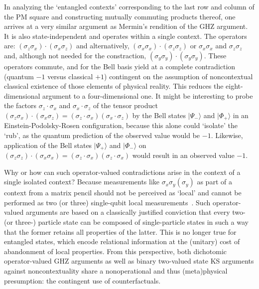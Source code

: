 \documentclass[
  twocolumn,
 showpacs,
 showkeys,
 preprintnumbers,
 amsmath,amssymb,
 aps,
 prl,
  longbibliography,
 floatfix,
 ]{revtex4-2}
\newcommand\myotimes{ }
\begin{document}
In analyzing the `entangled contexts' corresponding to the last row and column of the PM square and
constructing mutually commuting products thereof, one arrives at a very similar argument as Mermin's rendition of the GHZ argument.
It is also state-independent and operates within a single context. The operators are:
$
(\sigma_z \myotimes \sigma_x) \cdot (\sigma_x \myotimes \sigma_z)
$  and alternatively,
$
(\sigma_x\myotimes \sigma_x) \cdot (\sigma_z\myotimes \sigma_z)
$
or
$
\sigma_x\myotimes \sigma_x
$
and
$\sigma_z\myotimes \sigma_z
$
and, although not needed for the constraction,
$(\sigma_y \myotimes \sigma_y) \cdot (\sigma_y\myotimes \sigma_y)$.
These operators commute, and for the Bell basis yield at a complete contradiction
(quantum $-1$ versus classical $+1$) contingent on the assumption of noncontextual classical existence
of those elements of physical reality.
This reduces the eight-dimensional argument to a four-dimensional one.
It might be interesting to probe the factors
$
\sigma_z \cdot \sigma_x
$
and
$\sigma_x\cdot \sigma_z
$
of the tensor product
$
(\sigma_z \myotimes \sigma_x) \cdot (\sigma_x \myotimes \sigma_z)
= (\sigma_z \cdot \sigma_x) \myotimes (\sigma_x \cdot \sigma_z)
$
by the Bell states
$|\Psi_-\rangle$
and
$|\Phi_+\rangle$
in an Einstein-Podolsky-Rosen configuration,
because this alone could `isolate' the `rub', as the quantum prediction of the observed value would be
$-1$.
Likewise,
application of the  Bell states
$|\Psi_+\rangle$
and
$|\Phi_-\rangle$
on
$
(\sigma_z \myotimes \sigma_z) \cdot (\sigma_x \myotimes \sigma_x)
= (\sigma_z \cdot \sigma_x) \myotimes (\sigma_z \cdot \sigma_x)
$
would result in an observed value $-1$.


Why or how can such operator-valued contradictions arise in the context of a single isolated context?
Because measurements like $\sigma_x \myotimes \sigma_y ( \myotimes \sigma_y)$ as part of a context from a matrix pencil should not be perceived as `local'
and cannot be performed as two (or three) single-qubit
local measurements~\cite{cabello2021contextuality}.
Such operator-valued arguments are based on a classically justified conviction that every two- (or three-) particle state can be composed of single-particle states  in such a way that the former retains all properties of the latter.
This is no longer true for entangled states, which encode relational information at the (unitary) cost of
abandonment of local properties.
From this perspective, both dichotomic operator-valued GHZ arguments as well as binary two-valued state KS arguments against noncontextuality
share a nonoperational and thus (meta)physical presumption: the contingent use of counterfactuals.
\end{document}
